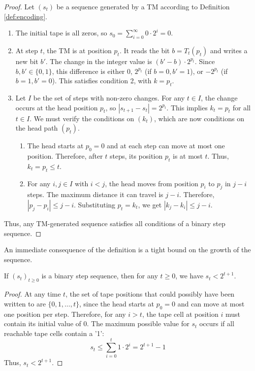 \begin{proof}
Let $(s_t)$ be a sequence generated by a TM according to Definition \ref{def:encoding}.
\begin{enumerate}
\item The initial tape is all zeros, so $s_0 = \sum_{i=0}^\infty 0 \cdot 2^i = 0$.
\item At step $t$, the TM is at position $p_t$. It reads the bit $b = T_t(p_t)$ and writes a new bit $b'$. The change in the integer value is $(b' - b) \cdot 2^{p_t}$. Since $b, b' \in \{0, 1\}$, this difference is either $0$, $2^{p_t}$ (if $b=0, b'=1$), or $-2^{p_t}$ (if $b=1, b'=0$). This satisfies condition 2, with $k = p_t$.
\item Let $I$ be the set of steps with non-zero changes. For any $t \in I$, the change occurs at the head position $p_t$, so $|s_{t+1} - s_t| = 2^{p_t}$. This implies $k_t = p_t$ for all $t \in I$. We must verify the conditions on $(k_t)$, which are now conditions on the head path $(p_t)$.
    \begin{enumerate}
    \item The head starts at $p_0=0$ and at each step can move at most one position. Therefore, after $t$ steps, its position $p_t$ is at most $t$. Thus, $k_t = p_t \leq t$.
    \item For any $i, j \in I$ with $i < j$, the head moves from position $p_i$ to $p_j$ in $j-i$ steps. The maximum distance it can travel is $j-i$. Therefore, $|p_j - p_i| \leq j-i$. Substituting $p_t=k_t$, we get $|k_j - k_i| \leq j-i$.
    \end{enumerate}
\end{enumerate}
Thus, any TM-generated sequence satisfies all conditions of a binary step sequence.
\end{proof}

An immediate consequence of the definition is a tight bound on the growth of the sequence.

\begin{theorem}
\label{thm:growth_bound}
\notready
{}
If $(s_t)_{t \geq 0}$ is a binary step sequence, then for any $t \geq 0$, we have $s_t < 2^{t+1}$.
\end{theorem}

\begin{proof}
At any time $t$, the set of tape positions that could possibly have been written to are $\{0, 1, \ldots, t\}$, since the head starts at $p_0=0$ and can move at most one position per step. Therefore, for any $i > t$, the tape cell at position $i$ must contain its initial value of $0$. The maximum possible value for $s_t$ occurs if all reachable tape cells contain a '1':
$$s_t \leq \sum_{i=0}^{t} 1 \cdot 2^i = 2^{t+1} - 1$$
Thus, $s_t < 2^{t+1}$.
\end{proof}

